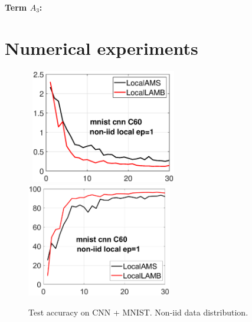 \documentclass{article}
\begin{document}
\textbf{ Term $A_3$:}


\section{Numerical experiments}\label{sec:numerical}

\begin{figure}[h]
    \begin{center}
        \mbox{
        \includegraphics[width=2.5in]{figure/mnist_trainloss_cnn_ep1_client60_iid0.eps}
        \includegraphics[width=2.5in]{figure/mnist_testerror_cnn_ep1_client60_iid0.eps}
        }
    \end{center}
    \vspace{-0.1in}
	\caption{Test accuracy on CNN + MNIST. Non-iid data distribution.}
	\label{fig:mnist-cnn-noniid}
\end{figure}
\end{document}
